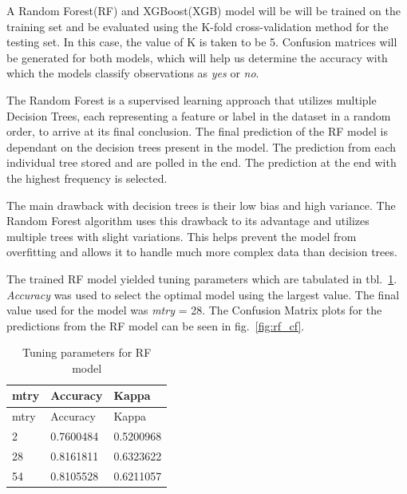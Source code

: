 \documentclass[runningheads]{llncs}
\makeatletter
\let\oldsubsubsection\subsubsection
\renewcommand\subsubsection{\@ifstar{\oldsubsubsection}{\oldsubsubsection*}}
\makeatother
\begin{document}
A Random Forest(RF) and XGBoost(XGB) model will be will be trained on
the training set and be evaluated using the K-fold cross-validation
method for the testing set. In this case, the value of K is taken to be
5. Confusion matrices will be generated for both models, which will help
us determine the accuracy with which the models classify observations as
\emph{yes} or \emph{no}.

\hypertarget{random-forest}{%
\subsubsection{Random Forest}\label{random-forest}}

The Random Forest is a supervised learning approach that utilizes
multiple Decision Trees, each representing a feature or label in the
dataset in a random order, to arrive at its final conclusion. The final
prediction of the RF model is dependant on the decision trees present in
the model. The prediction from each individual tree stored and are
polled in the end. The prediction at the end with the highest frequency
is selected.

The main drawback with decision trees is their low bias and high
variance. The Random Forest algorithm uses this drawback to its
advantage and utilizes multiple trees with slight variations. This helps
prevent the model from overfitting and allows it to handle much more
complex data than decision trees.

The trained RF model yielded tuning parameters which are tabulated in
tbl.~\ref{tbl:rf_params}. \emph{Accuracy} was used to select the optimal
model using the largest value. The final value used for the model was
\emph{mtry} = 28. The Confusion Matrix plots for the predictions from
the RF model can be seen in fig.~\ref{fig:rf_cf}.

\hypertarget{tbl:rf_params}{}
\begin{longtable}[]{@{}lll@{}}
\caption{\label{tbl:rf_params}Tuning parameters for RF
model}\tabularnewline
\toprule
mtry & Accuracy & Kappa\tabularnewline
\midrule
\endfirsthead
\toprule
mtry & Accuracy & Kappa\tabularnewline
\midrule
\endhead
2 & 0.7600484 & 0.5200968\tabularnewline
28 & 0.8161811 & 0.6323622\tabularnewline
54 & 0.8105528 & 0.6211057\tabularnewline
\bottomrule
\end{longtable}
\end{document}
